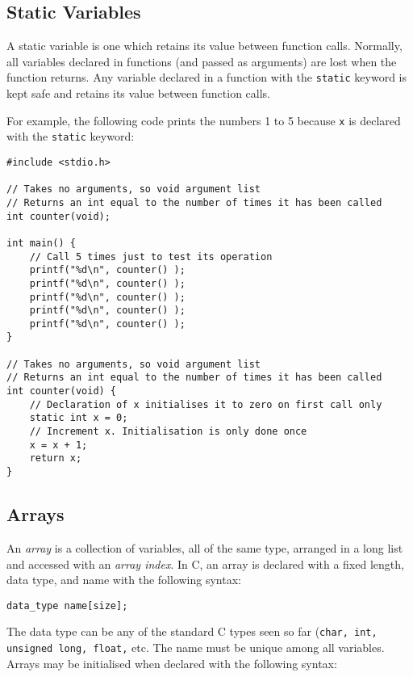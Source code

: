 \documentclass{lab}
\begin{document}
\pagebreak
\subsection{Static Variables}

A static variable is one which retains its value between function calls. Normally, all variables declared in functions (and passed as arguments) are lost when the function returns. Any variable declared in a function with the \texttt{static} keyword is kept safe and retains its value between function calls.

For example, the following code prints the numbers 1 to 5 because \texttt{x} is declared with the \texttt{static} keyword:

\begin{lstlisting}[style=CStyle]
#include <stdio.h>

// Takes no arguments, so void argument list
// Returns an int equal to the number of times it has been called
int counter(void); 

int main() {
	// Call 5 times just to test its operation
	printf("%d\n", counter() );
	printf("%d\n", counter() );
	printf("%d\n", counter() );
	printf("%d\n", counter() );
	printf("%d\n", counter() );
}
	
// Takes no arguments, so void argument list
// Returns an int equal to the number of times it has been called
int counter(void) {
	// Declaration of x initialises it to zero on first call only
	static int x = 0;
	// Increment x. Initialisation is only done once
	x = x + 1;
	return x;
}
\end{lstlisting}

\pagebreak
\subsection{Arrays}

An \textit{array} is a collection of variables, all of the same type, arranged in a long list and accessed with an \textit{array index}. In C, an array is declared with a fixed length, data type, and name with the following syntax:
\begin{lstlisting}[style=Ctable]
data_type name[size];
\end{lstlisting}

The data type can be any of the standard C types seen so far (\texttt{char, int, unsigned long, float,} etc. The name must be unique among all variables. Arrays may be initialised when declared with the following syntax:
\end{document}
